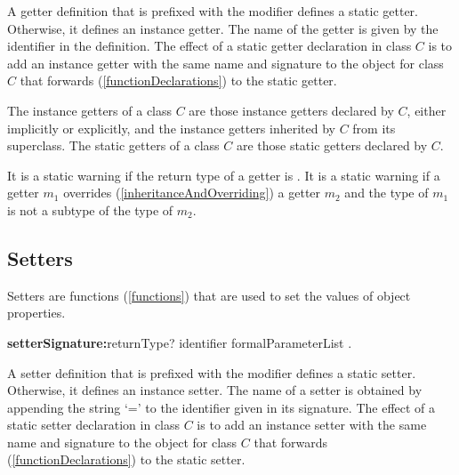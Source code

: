 \documentclass{article}
\begin{document}
\LMHash{}
A getter definition that is prefixed with the \STATIC{} modifier defines a static getter.
Otherwise, it defines an instance getter.
The name of the getter is given by the identifier in the definition.
The effect of a static getter declaration in class $C$ is to add an instance getter with the same name and signature to the  object for class $C$ that forwards (\ref{functionDeclarations}) to the static getter.

\LMHash{}
The instance getters of a class $C$ are those instance getters declared by $C$, either implicitly or explicitly, and the instance getters inherited by $C$ from its superclass.
The static getters of a class $C$ are those static getters declared by $C$.


\LMHash{}
It is a static warning if the return type of a getter is \VOID.
It is a static warning if a getter $m_1$ overrides (\ref{inheritanceAndOverriding}) a getter
$m_2$ and the type of $m_1$ is not a subtype of the type of $m_2$.


\subsection{Setters}

\LMHash{}
Setters are functions (\ref{functions}) that are used to set the values of object properties.

\begin{grammar}
{\bf setterSignature:}returnType? \SET{} identifier formalParameterList
  .
\end{grammar}


\LMHash{}
A setter definition that is prefixed with the \STATIC{} modifier defines a static setter.
Otherwise, it defines an instance setter.
The name of a setter is obtained by appending the string `=' to the identifier given in its signature.
The effect of a static setter declaration in class $C$ is to add an instance setter with the same name and signature to the  object for class $C$ that forwards (\ref{functionDeclarations}) to the static setter.

\end{document}
